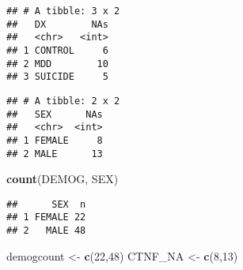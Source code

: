 \documentclass[]{article}
\newenvironment{Shaded}{\begin{snugshade}}{\end{snugshade}}
\newcommand{\CommentTok}[1]{\textcolor[rgb]{0.56,0.35,0.01}{\textit{#1}}}
\newcommand{\DataTypeTok}[1]{\textcolor[rgb]{0.13,0.29,0.53}{#1}}
\newcommand{\DecValTok}[1]{\textcolor[rgb]{0.00,0.00,0.81}{#1}}
\newcommand{\KeywordTok}[1]{\textcolor[rgb]{0.13,0.29,0.53}{\textbf{#1}}}
\newcommand{\NormalTok}[1]{#1}
\newcommand{\OperatorTok}[1]{\textcolor[rgb]{0.81,0.36,0.00}{\textbf{#1}}}
\newcommand{\StringTok}[1]{\textcolor[rgb]{0.31,0.60,0.02}{#1}}
\begin{document}
\begin{verbatim}
## # A tibble: 3 x 2
##   DX        NAs
##   <chr>   <int>
## 1 CONTROL     6
## 2 MDD        10
## 3 SUICIDE     5
\end{verbatim}

\begin{Shaded}
\end{Shaded}

\begin{verbatim}
## # A tibble: 2 x 2
##   SEX      NAs
##   <chr>  <int>
## 1 FEMALE     8
## 2 MALE      13
\end{verbatim}

\begin{Shaded}
\begin{Highlighting}[]
\KeywordTok{count}\NormalTok{(DEMOG, SEX)}
\end{Highlighting}
\end{Shaded}

\begin{verbatim}
##      SEX  n
## 1 FEMALE 22
## 2   MALE 48
\end{verbatim}

\begin{Shaded}
\begin{Highlighting}[]
\NormalTok{demogcount <-}\StringTok{ }\KeywordTok{c}\NormalTok{(}\DecValTok{22}\NormalTok{,}\DecValTok{48}\NormalTok{)}
\NormalTok{CTNF_NA <-}\StringTok{ }\KeywordTok{c}\NormalTok{(}\DecValTok{8}\NormalTok{,}\DecValTok{13}\NormalTok{)}
\end{Highlighting}
\end{Shaded}
\end{document}

